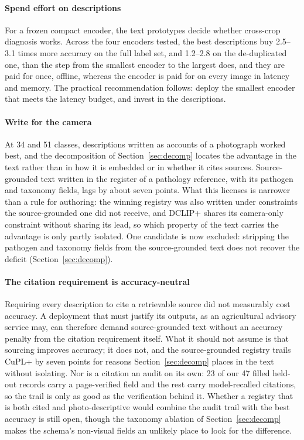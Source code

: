 \documentclass[a4paper,fleqn]{cas-dc}
\begin{document}
\paragraph{Spend effort on descriptions} For a frozen compact encoder, the text prototypes decide
whether cross-crop diagnosis works. Across the four encoders tested, the best descriptions buy
2.5--3.1 times more accuracy on the full label set, and 1.2--2.8 on the de-duplicated one, than the
step from the smallest encoder to the largest does, and they are paid for once, offline, whereas the
encoder is paid for on every image in latency and memory. The practical recommendation
follows: deploy the smallest encoder that meets the latency budget, and invest in the descriptions.

\paragraph{Write for the camera} At 34 and 51 classes, descriptions written as accounts of a
photograph worked best, and the decomposition of Section~\ref{sec:decomp} locates the advantage in
the text rather than in how it is embedded or in whether it cites sources. Source-grounded text
written in the register of a pathology reference, with its pathogen and taxonomy fields, lags by
about seven points. What this licenses is narrower than a rule for authoring: the winning registry
was also written under constraints the source-grounded one did not receive, and DCLIP+ shares its
camera-only constraint without sharing its lead, so which property of the text carries the advantage is only partly isolated. One candidate is now
excluded: stripping the pathogen and taxonomy fields from the source-grounded text does not
recover the deficit (Section~\ref{sec:decomp}).

\paragraph{The citation requirement is accuracy-neutral} Requiring every description to cite a
retrievable source did not measurably cost accuracy. A deployment that must justify its outputs, as
an agricultural advisory service may, can therefore demand source-grounded text without an accuracy
penalty from the citation requirement itself. What it should not assume is that sourcing improves
accuracy; it does not, and the source-grounded registry trails CuPL+ by seven points for reasons
Section~\ref{sec:decomp} places in the text without isolating. Nor is a citation an audit on its
own: 23 of our 47 filled held-out records carry a page-verified field and the rest carry
model-recalled citations, so the trail is only as good as the verification behind it. Whether a registry that is both cited and photo-descriptive would combine the audit trail with the
best accuracy is still open, though the taxonomy ablation of Section~\ref{sec:decomp} makes the
schema's non-visual fields an unlikely place to look for the difference.
\end{document}
